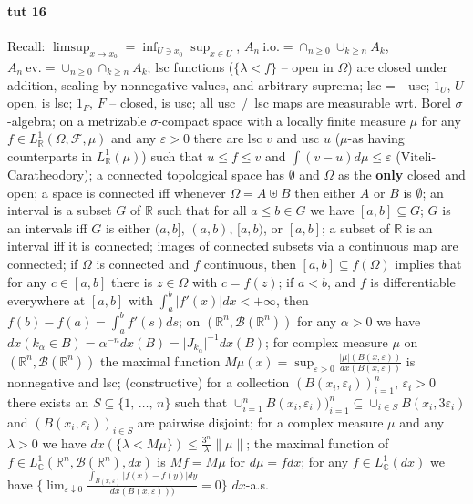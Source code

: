 \documentclass[a4paper]{article}
\newcommand{\Fcal}{\mathcal{F}}
\newcommand{\Bcal}{\mathcal{B}}
\newcommand{\real}{\mathbb{R}}
\newcommand{\cplx}{\mathbb{C}}
\begin{document}


\paragraph{tut 16} %
\label{par:tut_16}

Recall:
$\limsup_{x\to x_0} = \inf_{U\ni x_0} \sup_{x\in U}$,
$A_n~\text{i.o.} = \cap_{n\geq 0} \cup_{k\geq n} A_k$,
$A_n~\text{ev.} = \cup_{n\geq 0} \cap_{k\geq n} A_k$;
%
lsc functions ($\{\lambda < f\}$ -- open in $\Omega$) are closed under addition,
scaling by nonnegative values, and arbitrary suprema;
%
lsc = - usc;
%
$1_U$, $U$ open, is lsc;
%
$1_F$, $F$ -- closed, is usc;
%
all usc~/~lsc maps are measurable wrt. Borel $\sigma$-algebra;
%
on a metrizable $\sigma$-compact space with a locally finite measure $\mu$ for any
$f \in L^1_\real(\Omega, \Fcal, \mu)$ and any $\varepsilon > 0$ there are lsc $v$ and
usc $u$ ($\mu$-as having counterparts in $L^1_\real(\mu)$) such that $u \leq f \leq v$
and $\int (v - u) d\mu \leq \varepsilon$ (Viteli-Caratheodory);
%
a connected topological space has $\emptyset$ and $\Omega$ as the {\bf only} closed
and open;
%
a space is connected iff whenever $\Omega = A \uplus B$ then either $A$ or $B$ is
$\emptyset$;
%
an interval is a subset $G$ of $\real$ such that for all $a \leq b \in G$ we have
$[a, b] \subseteq G$;
%
$G$ is an intervals iff $G$ is either $(a, b]$, $(a, b)$, $[a, b)$, or $[a, b]$;
%
a subset of $\real$ is an interval iff it is connected;
%
images of connected subsets via a continuous map are connected;
%
if $\Omega$ is connected and $f$ continuous, then $[a, b] \subseteq f(\Omega)$ implies
that for any $c \in [a, b]$ there is $z \in \Omega$ with $c = f(z)$;
%
if $a < b$, and $f$ is differentiable everywhere at $[a, b]$ with
$\int_a^b | f'(x)| dx < + \infty$, then $f(b) - f(a) = \int_a^b f'(s) ds$;
%
on $(\real^n, \Bcal(\real^n))$ for any $\alpha > 0$ we have
$dx({k_\alpha \in B})
  = \alpha^{-n} dx(B)
  = \lvert J_{k_\alpha} \rvert^{-1} dx(B)$;
%
for complex measure $\mu$ on $(\real^n, \Bcal(\real^n))$ the maximal function
$M\mu(x) = \sup_{\varepsilon>0}
  \tfrac{|\mu|(B(x,\varepsilon))}
        {dx(B(x,\varepsilon))}$
is nonnegative and lsc;
%
(constructive) for a collection $(B(x_i,\varepsilon_i))_{i=1}^n$, $\varepsilon_i > 0$
there exists an $S \subseteq \{1,\,\ldots,\,n\}$ such that
$\cup_{i=1}^n B(x_i,\varepsilon_i))_{i=1}^n
  \subseteq \cup_{i\in S} B(x_i, 3\varepsilon_i)$
and $(B(x_i,\varepsilon_i))_{i\in S}$ are pairwise disjoint;
%
for a complex measure $\mu$ and any $\lambda > 0$ we have
$dx(\{\lambda < M\mu\}) \leq \tfrac{3^n}{\lambda} \|\mu\|$;
%
the maximal function of $f \in L^1_\cplx(\real^n, \Bcal(\real^n), dx)$ is
$M f = M \mu$ for $d\mu = f dx$;
%
for any $f \in L^1_\cplx(dx)$ we have
$\bigl\{
  \lim_{\varepsilon \downarrow 0}
    \tfrac{\int_{B(x, \varepsilon)} |f(x) - f(y)| dy}
          {dx(B(x, \varepsilon)))}
  = 0\bigr\}$ $dx$-a.s.
\end{document}
